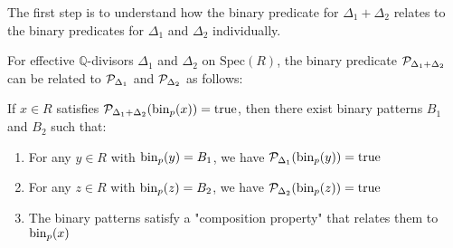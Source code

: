 The first step is to understand how the binary predicate for $\Delta_1 + \Delta_2$ relates to the binary predicates for $\Delta_1$ and $\Delta_2$ individually.

\begin{proposition}\label{prop:binary-predicate-decomposition}
For effective $\mathbb{Q}$-divisors $\Delta_1$ and $\Delta_2$ on $\text{Spec}(R)$, the binary predicate $\mathcal{P}_{\Delta_1+\Delta_2}$ can be related to $\mathcal{P}_{\Delta_1}$ and $\mathcal{P}_{\Delta_2}$ as follows:

If $x \in R$ satisfies $\mathcal{P}_{\Delta_1+\Delta_2}(\operatorname{bin}_p(x)) = \text{true}$, then there exist binary patterns $B_1$ and $B_2$ such that:
\begin{enumerate}
    \item For any $y \in R$ with $\operatorname{bin}_p(y) = B_1$, we have $\mathcal{P}_{\Delta_1}(\operatorname{bin}_p(y)) = \text{true}$
    \item For any $z \in R$ with $\operatorname{bin}_p(z) = B_2$, we have $\mathcal{P}_{\Delta_2}(\operatorname{bin}_p(z)) = \text{true}$
    \item The binary patterns satisfy a "composition property" that relates them to $\operatorname{bin}_p(x)$
\end{enumerate}
\end{proposition}

